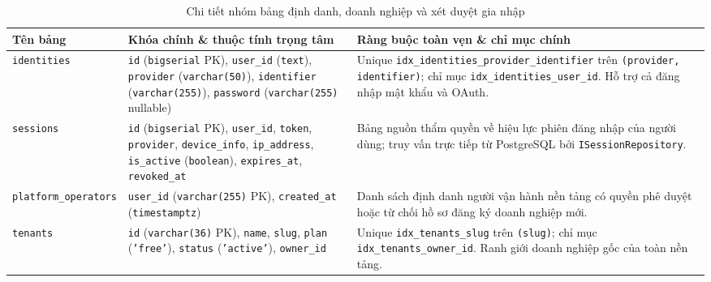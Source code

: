 \begin{table}[htbp]
  \centering
  \footnotesize
  \setlength{\tabcolsep}{4pt}
  \renewcommand{\arraystretch}{1.15}
  \caption{Chi tiết nhóm bảng định danh, doanh nghiệp và xét duyệt gia nhập}\label{tab:app-auth-tenant}
  \begin{tabularx}{\linewidth}{@{}
    >{\raggedright\arraybackslash}p{3.5cm}
    >{\raggedright\arraybackslash}p{4.9cm}
    >{\raggedright\arraybackslash}X@{}}
    \toprule
    Tên bảng & Khóa chính \& thuộc tính trọng tâm & Ràng buộc toàn vẹn \& chỉ mục chính \\
    \midrule
    \texttt{identities} &
    \texttt{id} (\texttt{bigserial} PK), \texttt{user\_id} (\texttt{text}), \texttt{provider} (\texttt{varchar(50)}), \texttt{identifier} (\texttt{varchar(255)}), \texttt{password} (\texttt{varchar(255)} nullable) &
    Unique \texttt{idx\_\hspace{0pt}identities\_\hspace{0pt}provider\_\hspace{0pt}identifier} trên \texttt{(provider, identifier)}; chỉ mục \texttt{idx\_\hspace{0pt}identities\_\hspace{0pt}user\_id}. Hỗ trợ cả đăng nhập mật khẩu và OAuth. \\
    \texttt{sessions} &
    \texttt{id} (\texttt{bigserial} PK), \texttt{user\_id}, \texttt{token}, \texttt{provider}, \texttt{device\_info}, \texttt{ip\_address}, \texttt{is\_active} (\texttt{boolean}), \texttt{expires\_at}, \texttt{revoked\_at} &
    Bảng nguồn thẩm quyền về hiệu lực phiên đăng nhập của người dùng; truy vấn trực tiếp từ PostgreSQL bởi \texttt{ISessionRepository}. \\
    \texttt{platform\_\hspace{0pt}operators} &
    \texttt{user\_id} (\texttt{varchar(255)} PK), \texttt{created\_at} (\texttt{timestamptz}) &
    Danh sách định danh người vận hành nền tảng có quyền phê duyệt hoặc từ chối hồ sơ đăng ký doanh nghiệp mới. \\
    \texttt{tenants} &
    \texttt{id} (\texttt{varchar(36)} PK), \texttt{name}, \texttt{slug}, \texttt{plan} (\texttt{'free'}), \texttt{status} (\texttt{'active'}), \texttt{owner\_id} &
    Unique \texttt{idx\_\hspace{0pt}tenants\_\hspace{0pt}slug} trên \texttt{(slug)}; chỉ mục \texttt{idx\_\hspace{0pt}tenants\_\hspace{0pt}owner\_id}. Ranh giới doanh nghiệp gốc của toàn nền tảng. \\

\end{tabularx}
\end{table}
